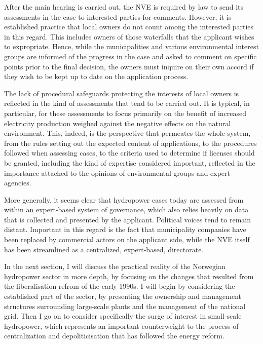 After the main hearing is carried out, the NVE is required by law to send its assessments in the case to interested parties for comments. However, it is established practice that local owners do not count among the interested parties in this regard. This includes owners of those waterfalls that the applicant wishes to expropriate. Hence, while the municipalities and various environmental interest groups are informed of the progress in the case and asked to comment on specific points prior to the final decision, the owners must inquire on their own accord if they wish to be kept up to date on the application process. 

The lack of procedural safeguards protecting the interests of local owners is reflected in the kind of assessments that tend to be carried out. It is typical, in particular, for these assessments to focus primarily on the benefit of increased electricity production weighed against the negative effects on the natural environment. This, indeed, is the perspective that permeates the whole system, from the rules setting out the expected content of applications, to the procedures followed when assessing cases, to the criteria used to determine if licenses should be granted, including the kind of expertise considered important, reflected in the importance attached to the opinions of environmental groups and expert agencies.

More generally, it seems clear that hydropower cases today are assessed from within an expert-based system of governance, which also relies heavily on data that is collected and presented by the applicant. Political voices tend to remain distant. Important in this regard is the fact that municipality companies have been replaced by commercial actors on the applicant side, while the NVE itself has been streamlined as a centralized, expert-based, directorate.

In the next section, I will discuss the practical reality of the Norwegian hydropower sector in more depth, by focusing on the changes that resulted from the liberalisation refrom of the early 1990s. I will begin by considering the established part of the sector, by presenting the ownership and management structures surrounding large-scale plants and the management of the national grid. Then I go on to consider specifically the surge of interest in small-scale hydropower, which represents an important counterweight to the process of centralization and depoliticisation that has followed the energy reform.

